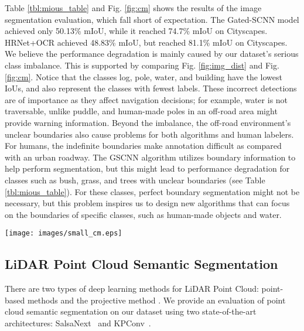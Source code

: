 \documentclass[letterpaper, 10 pt, conference]{ieeeconf}
\begin{document}
Table \ref{tbl:mious_table} and Fig. \ref{fig:cm} shows the results of the image segmentation evaluation, which fall short of expectation. The Gated-SCNN model achieved only 50.13\% mIoU, while it reached 74.7\% mIoU \cite{Takikawa2019} on Cityscapes. HRNet+OCR achieved 48.83\% mIoU, but reached 81.1\% mIoU on Cityscapes. We believe the performance degradation is mainly caused by our dataset's serious class imbalance. This is supported by comparing Fig. \ref{fig:img_dist} and Fig. \ref{fig:cm}. Notice that the classes log, pole, water, and building have the lowest IoUs, and also represent the classes with fewest labels. These incorrect detections are of importance as they affect navigation decisions; for example, water is not traversable, unlike puddle, and human-made poles in an off-road area might provide warning information. Beyond the imbalance, the off-road environment's unclear boundaries also cause problems for both algorithms and human labelers. For humans, the indefinite boundaries make annotation difficult as compared with an urban roadway. The GSCNN algorithm utilizes boundary information to help perform segmentation, but this might lead to performance degradation for classes such as bush, grass, and trees with unclear boundaries (see Table \ref{tbl:mious_table}). For these classes, perfect boundary segmentation might not be necessary, but this problem inspires us to design new algorithms that can focus on the boundaries of specific classes, such as human-made objects and water.


\begin{figure*}
\vspace{5pt}
  \centering
  \texttt{[image: images/small\_cm.eps]}
  \caption{Confusion matrix. The y and x axis numbers represent classes ids (1: sky; 2: grass; 3: tree; 4: bush; 5: concrete; 6: mud; 7: person; 8: puddle; 9: rubble; 10: barrier; 11: log; 12: fence; 13: vehicle; 14: object; 15: pole; 16: water; 17: asphalt;18: building; 19: void.) Note that the sky label is omitted for the point cloud algorithm confusion matrices.}   
  \label{fig:cm}
\end{figure*} \subsection{LiDAR Point Cloud Semantic Segmentation}
There are two types of deep learning methods for LiDAR Point Cloud: point-based methods and the projective method \cite{Guo2020}. We provide an evaluation of point cloud semantic segmentation on our dataset using two state-of-the-art architectures: SalsaNext~\cite{Cortinhal2020} and KPConv~\cite{Thomas2019}.
\end{document}
